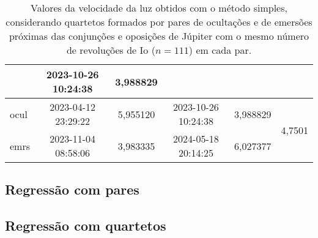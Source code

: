 \documentclass[]{article}
\begin{document}
\begin{table}[htb]
\begin{center}
\begin{tabular}{lccccc}
            & 2023-10-26 10:24:38 & 3,988829\\
      \hline
      ocul  & 2023-04-12 23:29:22 & 5,955120
            & 2023-10-26 10:24:38 & 3,988829
            & \multirow{2}{*}{4,7501}\\
      emrs  & 2023-11-04 08:58:06 & 3,983335
            & 2024-05-18 20:14:25 & 6,027377\\
      \hline
    \end{tabular}
  \end{center}
  \caption{\label{tab:bb} Valores da velocidade da luz obtidos com o método simples,
  considerando quartetos formados por pares de ocultações e de emersões próximas
  das conjunções e oposições de Júpiter com o mesmo número de revoluções de Io
  ($n=111$) em cada par.}
\end{table}



\subsection{Regressão com pares}
\subsection{Regressão com quartetos}
\end{document}
